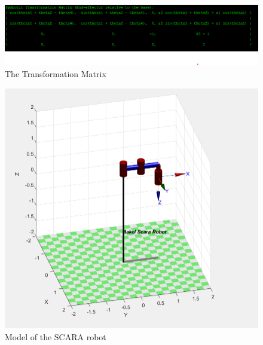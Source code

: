 \documentclass[12pt]{report}
\begin{document}
\begin{figure}[H]
	\hspace{-1cm} 
	\includegraphics[scale=0.8]{run3} %
	\caption{The Transformation Matrix}
	\label{run3} %
\end{figure}
\begin{figure}[H]
	\centering
	\includegraphics[scale=1]{run4} %
	\caption{Model of the SCARA robot}
	\label{run4} %
\end{figure}
\end{document}
